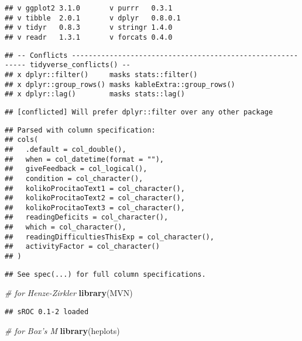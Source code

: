 \documentclass[12pt,]{article}
\newenvironment{Shaded}{\begin{snugshade}}{\end{snugshade}}
\newcommand{\CommentTok}[1]{\textcolor[rgb]{0.56,0.35,0.01}{\textit{#1}}}
\newcommand{\KeywordTok}[1]{\textcolor[rgb]{0.13,0.29,0.53}{\textbf{#1}}}
\newcommand{\NormalTok}[1]{#1}
\begin{document}
\begin{verbatim}
## v ggplot2 3.1.0       v purrr   0.3.1  
## v tibble  2.0.1       v dplyr   0.8.0.1
## v tidyr   0.8.3       v stringr 1.4.0  
## v readr   1.3.1       v forcats 0.4.0
\end{verbatim}

\begin{verbatim}
## -- Conflicts ----------------------------------------------------------- tidyverse_conflicts() --
## x dplyr::filter()     masks stats::filter()
## x dplyr::group_rows() masks kableExtra::group_rows()
## x dplyr::lag()        masks stats::lag()
\end{verbatim}

\begin{verbatim}
## [conflicted] Will prefer dplyr::filter over any other package
\end{verbatim}

\begin{verbatim}
## Parsed with column specification:
## cols(
##   .default = col_double(),
##   when = col_datetime(format = ""),
##   giveFeedback = col_logical(),
##   condition = col_character(),
##   kolikoProcitaoText1 = col_character(),
##   kolikoProcitaoText2 = col_character(),
##   kolikoProcitaoText3 = col_character(),
##   readingDeficits = col_character(),
##   which = col_character(),
##   readingDifficultiesThisExp = col_character(),
##   activityFactor = col_character()
## )
\end{verbatim}

\begin{verbatim}
## See spec(...) for full column specifications.
\end{verbatim}

\begin{Shaded}
\begin{Highlighting}[]
\CommentTok{# for Henze-Zirkler}
\KeywordTok{library}\NormalTok{(MVN)}
\end{Highlighting}
\end{Shaded}

\begin{verbatim}
## sROC 0.1-2 loaded
\end{verbatim}

\begin{Shaded}
\begin{Highlighting}[]
\CommentTok{# for Box's M}
\KeywordTok{library}\NormalTok{(heplots)}
\end{Highlighting}
\end{Shaded}
\end{document}

